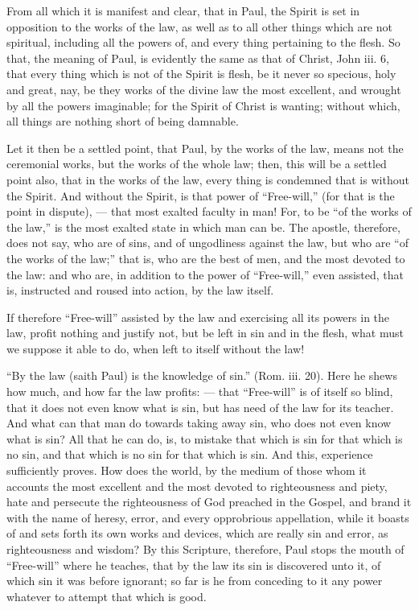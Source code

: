 From all which it is manifest and clear, that in Paul, the Spirit is set in opposition to the works of the law, as well as to all other things which are not spiritual, including all the powers of, and every thing pertaining to the flesh. So that, the meaning of Paul, is evidently the same as that of Christ, John iii. 6, that every thing which is not of the Spirit is flesh, be it never so specious, holy and great, nay, be they works of the divine law the most excellent, and wrought by all the powers imaginable; for the Spirit of Christ is wanting; without which, all things are nothing short of being damnable.

Let it then be a settled point, that Paul, by the works of the law, means not the ceremonial works, but the works of the whole law; then, this will be a settled point also, that in the works of the law, every thing is condemned that is without the Spirit. And without the Spirit, is that power of “Free-will,” (for that is the point in dispute), — that most exalted faculty in man! For, to be “of the works of the law,” is the most exalted state in which man can be. The apostle, therefore, does not say, who are of sins, and of ungodliness against the law, but who are “of the works of the law;” that is, who are the best of men, and the most devoted to the law: and who are, in addition to the power of “Free-will,” even assisted, that is, instructed and roused into action, by the law itself.

If therefore “Free-will” assisted by the law and exercising all its powers in the law, profit nothing and justify not, but be left in sin and in the flesh, what must we suppose it able to do, when left to itself without the law!

“By the law (saith Paul) is the knowledge of sin.” (Rom. iii. 20). Here he shews how much, and how far the law profits: — that “Free-will” is of itself so blind, that it does not even know what is sin, but has need of the law for its teacher. And what can that man do towards taking away sin, who does not even know what is sin? All that he can do, is, to mistake that which is sin for that which is no sin, and that which is no sin for that which is sin. And this, experience sufficiently proves. How does the world, by the medium of those whom it accounts the most excellent and the most devoted to righteousness and piety, hate and persecute the righteousness of God preached in the Gospel, and brand it with the name of heresy, error, and every opprobrious appellation, while it boasts of and sets forth its own works and devices, which are really sin and error, as righteousness and wisdom? By this Scripture, therefore, Paul stops the mouth of “Free-will” where he teaches, that by the law its sin is discovered unto it, of which sin it was before ignorant; so far is he from conceding to it any power whatever to attempt that which is good.

